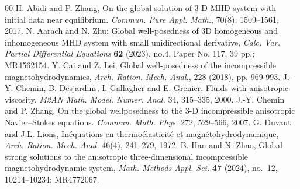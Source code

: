 \documentclass[11pt]{amsart}
\theoremstyle{definition}
\numberwithin{equation}{section}
\begin{document}

\begin{thebibliography}{00}
	H. Abidi and  P. Zhang, On the global solution of 3-D MHD system with initial data near equilibrium. {\it Commun. Pure Appl. Math.},  70(8), 1509–1561, 2017.
	N. Aarach and N. Zhu: Global well-posedness of 3D homogeneous and inhomogeneous MHD system with small unidirectional derivative, {\it Calc. Var. Partial Differential Equations} {\bf 62} (2023), no.4, Paper No. 117, 39 pp.; MR4562154.
	Y. Cai and Z. Lei, Global well-posedness of the incompressible magnetohydrodynamics, {\it Arch. Ration. Mech. Anal.},  228 (2018), pp. 969-993.
	 J.-Y. Chemin,  B. Desjardins,  I. Gallagher and   E. Grenier, Fluids with anisotropic viscosity. {\it M2AN Math. Model. Numer. Anal.} 34, 315–335, 2000.
	 J.-Y. Chemin and  P. Zhang, On the global wellposedness to the 3-D incompressible anisotropic Navier–Stokes equations. {\it Commun. Math. Phys.} 272, 529–566, 2007.
	 G. Duvaut and  J.L. Lions, Inéquations en thermoélasticité et magnétohydrodynamique, {\it Arch. Ration. Mech. Anal.} 46(4), 241–279, 1972.
	B. Han and N. Zhao, Global strong solutions to the anisotropic three-dimensional incompressible magnetohydrodynamic system, {\it Math. Methods Appl. Sci.} {\bf 47} (2024), no.~12, 10214--10234; MR4772067.

\end{thebibliography}
\end{document}
